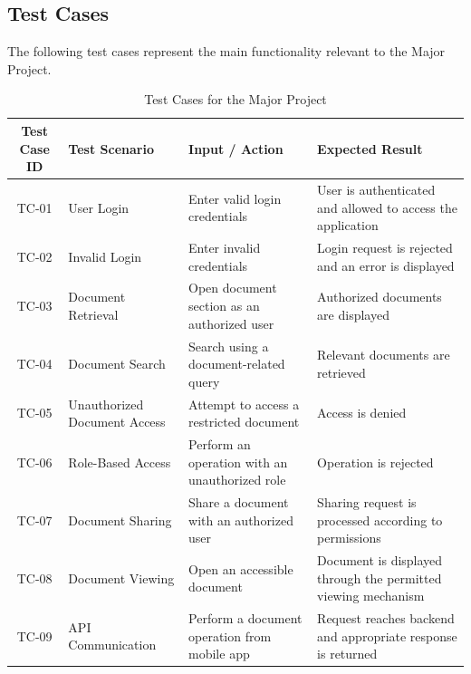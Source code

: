 \documentclass[12pt]{article}
\begin{document}
\subsection{Test Cases}

The following test cases represent the main functionality relevant to the Major Project.
\begin{table}[H]
\centering
\caption{Test Cases for the Major Project}
\label{tab:test_cases}
\renewcommand{\arraystretch}{1.35}
\begin{tabular}{|c|p{3.0cm}|p{4.0cm}|p{5.3cm}|}
\hline
\textbf{Test Case ID} &
\textbf{Test Scenario} &
\textbf{Input / Action} &
\textbf{Expected Result} \\ \hline

TC-01 &
User Login &
Enter valid login credentials &
User is authenticated and allowed to access the application \\ \hline

TC-02 &
Invalid Login &
Enter invalid credentials &
Login request is rejected and an error is displayed \\ \hline

TC-03 &
Document Retrieval &
Open document section as an authorized user &
Authorized documents are displayed \\ \hline

TC-04 &
Document Search &
Search using a document-related query &
Relevant documents are retrieved \\ \hline

TC-05 &
Unauthorized Document Access &
Attempt to access a restricted document &
Access is denied \\ \hline

TC-06 &
Role-Based Access &
Perform an operation with an unauthorized role &
Operation is rejected \\ \hline

TC-07 &
Document Sharing &
Share a document with an authorized user &
Sharing request is processed according to permissions \\ \hline

TC-08 &
Document Viewing &
Open an accessible document &
Document is displayed through the permitted viewing mechanism \\ \hline

TC-09 &
API Communication &
Perform a document operation from mobile app &
Request reaches backend and appropriate response is returned \\ \hline


\end{tabular}
\end{table}
\end{document}
